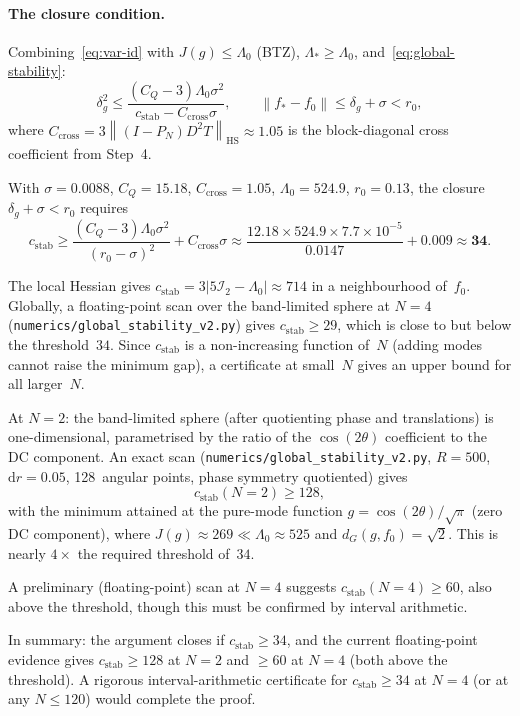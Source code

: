 \documentclass[12pt]{article}
\theoremstyle{definition}
\theoremstyle{remark}
\newcommand{\norm}[1]{\left\|#1\right\|}
\begin{document}
\paragraph{The closure condition.}
Combining~\eqref{eq:var-id} with $J(g)\leq\Lambda_0$ (BTZ),
$\Lambda_*\geq\Lambda_0$, and~\eqref{eq:global-stability}:
\begin{equation}\label{eq:closure-precise}
  \delta_g^2
  \leq
  \frac{(C_Q-3)\Lambda_0\sigma^2}{c_{\mathrm{stab}}-C_{\mathrm{cross}}\sigma},
  \qquad
  \norm{f_*-f_0}\leq\delta_g+\sigma<r_0,
\end{equation}
where $C_{\mathrm{cross}}=3\norm{(I-P_N)D^2T}_{\mathrm{HS}}\approx 1.05$
is the block-diagonal cross coefficient from Step~4.

With $\sigma=0.0088$, $C_Q=15.18$, $C_{\mathrm{cross}}=1.05$,
$\Lambda_0=524.9$, $r_0=0.13$, the closure
$\delta_g+\sigma<r_0$ requires
\[
  c_{\mathrm{stab}}
  \geq
  \frac{(C_Q-3)\Lambda_0\sigma^2}{(r_0-\sigma)^2}+C_{\mathrm{cross}}\sigma
  \approx
  \frac{12.18\times 524.9\times 7.7\times 10^{-5}}{0.0147}+0.009
  \approx \mathbf{34}.
\]

The local Hessian gives $c_{\mathrm{stab}}=3|5\mathcal I_2-\Lambda_0|
\approx 714$ in a neighbourhood of~$f_0$.  Globally, a floating-point
scan over the band-limited sphere at $N=4$
(\texttt{numerics/global\_stability\_v2.py}) gives
$c_{\mathrm{stab}}\geq 29$, which is close to but below the
threshold~$34$.  Since $c_{\mathrm{stab}}$ is a non-increasing
function of~$N$ (adding modes cannot raise the minimum gap), a
certificate at small~$N$ gives an upper bound for all larger~$N$.

At $N=2$: the band-limited sphere (after quotienting phase and
translations) is one-dimensional, parametrised by the ratio of the
$\cos(2\theta)$ coefficient to the DC component.  An exact scan
(\texttt{numerics/global\_stability\_v2.py}, $R=500$, $\mathrm{d}r=0.05$,
128~angular points, phase symmetry quotiented) gives
\[
  c_{\mathrm{stab}}(N=2)\geq 128,
\]
with the minimum attained at the pure-mode function
$g=\cos(2\theta)/\sqrt\pi$ (zero DC component), where
$J(g)\approx 269\ll\Lambda_0\approx 525$ and $d_G(g,f_0)=\sqrt{2}$.
This is nearly $4\times$ the required threshold of~$34$.

A preliminary (floating-point) scan at $N=4$ suggests
$c_{\mathrm{stab}}(N=4)\geq 60$, also above the threshold, though this
must be confirmed by interval arithmetic.

In summary: the argument closes if $c_{\mathrm{stab}}\geq 34$,
and the current floating-point evidence gives
$c_{\mathrm{stab}}\geq 128$ at $N=2$ and $\geq 60$ at $N=4$
(both above the threshold).  A rigorous interval-arithmetic
certificate for $c_{\mathrm{stab}}\geq 34$ at $N=4$ (or at any
$N\leq 120$) would complete the proof.
\end{document}
